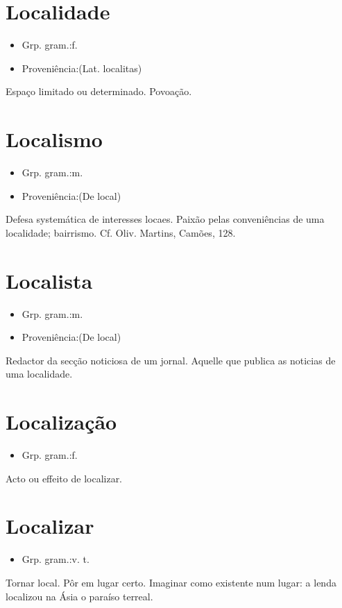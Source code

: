 \section{Localidade}
\begin{itemize}
\item {Grp. gram.:f.}
\end{itemize}
\begin{itemize}
\item {Proveniência:(Lat. \textunderscore localitas\textunderscore )}
\end{itemize}
Espaço limitado ou determinado.
Povoação.
\section{Localismo}
\begin{itemize}
\item {Grp. gram.:m.}
\end{itemize}
\begin{itemize}
\item {Proveniência:(De \textunderscore local\textunderscore )}
\end{itemize}
Defesa systemática de interesses locaes.
Paixão pelas conveniências de uma localidade; bairrismo. Cf. Oliv. Martins, \textunderscore Camões\textunderscore , 128.
\section{Localista}
\begin{itemize}
\item {Grp. gram.:m.}
\end{itemize}
\begin{itemize}
\item {Proveniência:(De \textunderscore local\textunderscore )}
\end{itemize}
Redactor da secção noticiosa de um jornal.
Aquelle que publica as noticias de uma localidade.
\section{Localização}
\begin{itemize}
\item {Grp. gram.:f.}
\end{itemize}
Acto ou effeito de localizar.
\section{Localizar}
\begin{itemize}
\item {Grp. gram.:v. t.}
\end{itemize}
Tornar local.
Pôr em lugar certo.
Imaginar como existente num lugar: \textunderscore a lenda localizou na Ásia o paraíso terreal\textunderscore .
